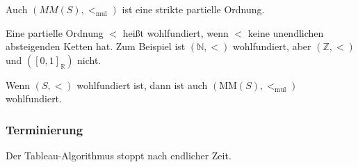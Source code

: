 \setcounter{definition}{5}
\begin{lemma}
    Auch $(MM(S), <_{\text{mul}})$ ist eine strikte partielle Ordnung.
\end{lemma}

Eine partielle Ordnung $<$ heißt wohlfundiert, wenn $<$ keine unendlichen absteigenden Ketten hat. Zum Beispiel ist $(\mathbb{N}, <)$ wohlfundiert, aber $(\mathbb{Z}, <)$ und $({\left[0, 1\right]}_{\mathbb{R}})$ nicht.

\begin{theorem}
Wenn $\left( S, < \right)$ wohlfundiert ist, dann ist auch $\left( \text{MM}\left( S \right), <_{\text{mul}} \right)$
wohlfundiert.
\end{theorem}


\subsubsection{Terminierung}

\setcounter{definition}{4}
\begin{theorem}\label{thm:termination}
Der Tableau-Algorithmus stoppt nach endlicher Zeit.
\end{theorem}
\setcounter{definition}{7}

